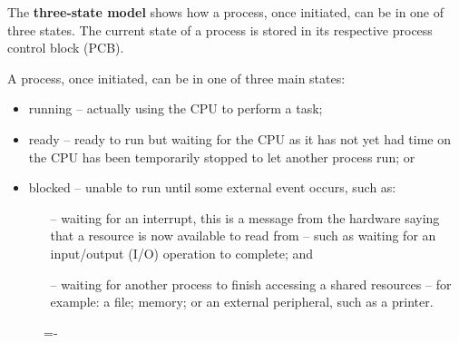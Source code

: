 \documentclass[a4paper]{systems-software}
\begin{document}
The \textbf{three-state model} shows how a process, once initiated, can be in one of three states. The current state of a process is stored in its respective process control block (PCB).

A process, once initiated, can be in one of three main states:
\begin{itemize}
	\item running -- actually using the CPU to perform a task;
	\item ready -- ready to run but waiting for the CPU as it has not yet had time on the CPU has been temporarily stopped to let another process run; or
	\item blocked --  unable to run until some external event occurs, such as:
		\begin{itemize}
			\item[--] waiting for an interrupt, this is a message from the hardware saying that a resource is now available to read from – such as waiting for an input/output (I/O) operation to complete; and
			\item[--] waiting for another process to finish accessing a shared resources – for example: a file; memory; or an external peripheral, such as a printer.
		\end{itemize}
\end{itemize}

\begin{figure}[H]
  \lineskip=-\fboxrule
\end{figure}
\end{document}
